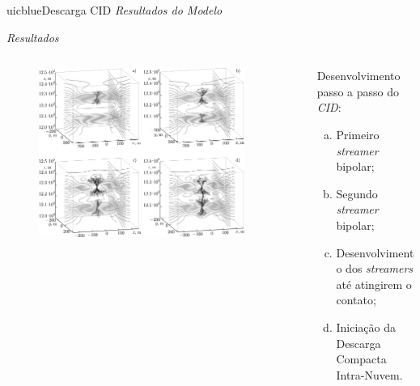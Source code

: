 \documentclass{beamer}
\begin{document}
\begin{chapter}{uicblue}{Descarga CID}
\textit{Resultados do Modelo}
\end{chapter}

\begin{frame}{\textit{Resultados}}
	\begin{columns}
		\begin{column}{0.5\textwidth}
			\begin{figure}
				\centering
				\includegraphics[width=0.9\textwidth]{imagens_artigo/14.png}
			\end{figure}
		\end{column}
		\begin{column}[c]{0.5\textwidth}
			Desenvolvimento passo a passo do \textit{CID}:
			\begin{enumerate}[(a)]
				\item Primeiro \textit{streamer} bipolar;
				\item Segundo \textit{streamer} bipolar;
				\item Desenvolvimento dos \textit{streamers} até atingirem o contato;
				\item Iniciação da Descarga Compacta Intra-Nuvem.
			\end{enumerate}

		\end{column}
	\end{columns}
\end{frame}
\end{document}
